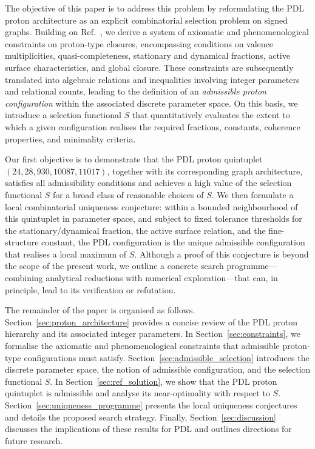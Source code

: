 \documentclass[11pt,a4paper]{article}
\theoremstyle{definition}
\begin{document}
The objective of this paper is to address this problem by reformulating the PDL proton architecture as an explicit combinatorial selection problem on signed graphs. Building on Ref.~\cite{Combinatorial_Proton_v2_2026}, we derive a system of axiomatic and phenomenological constraints on proton-type closures, encompassing conditions on valence multiplicities, quasi-completeness, stationary and dynamical fractions, active surface characteristics, and global closure.\cite{Combinatorial_Proton_v2_2026,PDL_Global_Mapping_2026} These constraints are subsequently translated into algebraic relations and inequalities involving integer parameters and relational counts, leading to the definition of an \emph{admissible proton configuration} within the associated discrete parameter space. On this basis, we introduce a selection functional $S$ that quantitatively evaluates the extent to which a given configuration realises the required fractions, constants, coherence properties, and minimality criteria.

Our first objective is to demonstrate that the PDL proton quintuplet $(24,28,930,10087,11017)$, together with its corresponding graph architecture, satisfies all admissibility conditions and achieves a high value of the selection functional $S$ for a broad class of reasonable choices of $S$.\cite{Combinatorial_Proton_v2_2026,Alpha_PDL_v2_2026} We then formulate a local combinatorial uniqueness conjecture: within a bounded neighbourhood of this quintuplet in parameter space, and subject to fixed tolerance thresholds for the stationary/dynamical fraction, the active surface relation, and the fine-structure constant, the PDL configuration is the unique admissible configuration that realises a local maximum of $S$.\cite{Combinatorial_Proton_v2_2026,PDL_Global_Mapping_2026} Although a proof of this conjecture is beyond the scope of the present work, we outline a concrete search programme—combining analytical reductions with numerical exploration—that can, in principle, lead to its verification or refutation.

The remainder of the paper is organised as follows. Section~\ref{sec:proton_architecture} provides a concise review of the PDL proton hierarchy and its associated integer parameters. In Section~\ref{sec:constraints}, we formalise the axiomatic and phenomenological constraints that admissible proton-type configurations must satisfy. Section~\ref{sec:admissible_selection} introduces the discrete parameter space, the notion of admissible configuration, and the selection functional $S$. In Section~\ref{sec:ref_solution}, we show that the PDL proton quintuplet is admissible and analyse its near-optimality with respect to $S$. Section~\ref{sec:uniqueness_programme} presents the local uniqueness conjectures and details the proposed search strategy. Finally, Section~\ref{sec:discussion} discusses the implications of these results for PDL and outlines directions for future research.
\end{document}
